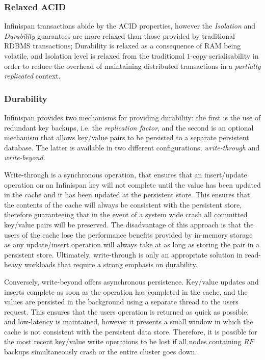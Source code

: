 	    \subsubsection{Relaxed ACID}
	    Infinispan transactions abide by the ACID\citep{Haerder:1983:PTD:289.291} properties, however the \emph{Isolation} and \emph{Durability} guarantees are more relaxed than those provided by traditional RDBMS transactions; Durability is relaxed as a consequence of RAM being volatile, and Isolation level is relaxed from the traditional $1$-copy serialisability in order to reduce the overhead of maintaining distributed transactions in a \emph{partially replicated} context.  
	    
		    \subsubsection*{Durability}
		    Infinispan provides two mechanisms for providing durability: the first is the use of redundant key backups, i.e. the \emph{replication factor}, and the second is an optional mechanism that allows key/value pairs to be persisted to a separate persistent database.  The latter is available in two different configurations, \emph{write-through} and \emph{write-beyond}. 
		    
		    Write-through is a synchronous operation, that ensures that an insert/update operation on an Infinispan key will not complete until the value has been updated in the cache and it has been updated at the persistent store.  This ensures that the contents of the cache will always be consistent with the persistent store, therefore guaranteeing that in the event of a system wide crash all committed key/value pairs will be preserved.  The disadvantage of this approach is that the users of the cache lose the performance benefits provided by in-memory storage as any update/insert operation will always take at as long as storing the pair in a persistent store.  Ultimately, write-through is only an appropriate solution in read-heavy workloads that require a strong emphasis on durability.  
		    
		    Conversely, write-beyond offers asynchronous persistence.  Key/value updates and inserts complete as soon as the operation has completed in the cache, and the values are persisted in the background using a separate thread to the users request.  This ensures that the users operation is returned as quick as possible, and low-latency is maintained, however it presents a small window in which the cache is not consistent with the persistent data store.  Therefore, it is possible for the most recent key/value write operations to be lost if all nodes containing $RF$ backups simultaneously crash or the entire cluster goes down.  
    
